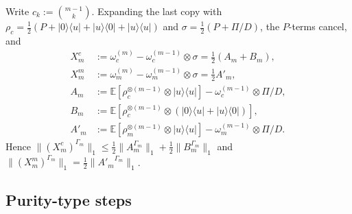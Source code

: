 \documentclass[pdflatex,sn-mathphys-num]{sn-jnl}%
\theoremstyle{thmstyleone}
\theoremstyle{thmstylethree}
\theoremstyle{thmstyletwo}
\newcommand{\E}{\mathbb{E}}
\newcommand{\ket}[1]{|#1\rangle}
\newcommand{\bra}[1]{\langle #1|}
\begin{document}
Write $c_k:=\binom{m-1}k$. Expanding the last copy with $\rho_c=\tfrac12(P+\ket0\bra u+\ket u\bra0+\ket u\bra u)$
and $\sigma=\tfrac12(P+\Pi/D)$, the $P$-terms cancel, and
\begin{align*}
X^c_m&:=\omega_c^{(m)}-\omega_c^{(m-1)}\otimes\sigma=\tfrac12(A_m+B_m),\\
X^m_m&:=\omega_m^{(m)}-\omega_m^{(m-1)}\otimes\sigma=\tfrac12A'_m,\\
A_m&:=\E[\rho_c^{\otimes(m-1)}\otimes\ket u\bra u]-\omega_c^{(m-1)}\otimes\Pi/D,\\
B_m&:=\E[\rho_c^{\otimes(m-1)}\otimes(\ket0\bra u+\ket u\bra0)],\\
A'_m&:=\E[\rho_m^{\otimes(m-1)}\otimes\ket u\bra u]-\omega_m^{(m-1)}\otimes\Pi/D .
\end{align*}
Hence $\|(X^c_m)^{\Gamma_m}\|_1\le\tfrac12\|A_m^{\Gamma_m}\|_1+\tfrac12\|B_m^{\Gamma_m}\|_1$ and
$\|(X^m_m)^{\Gamma_m}\|_1=\tfrac12\|{A'_m}^{\Gamma_m}\|_1$.

\subsection{Purity-type steps}
\end{document}
